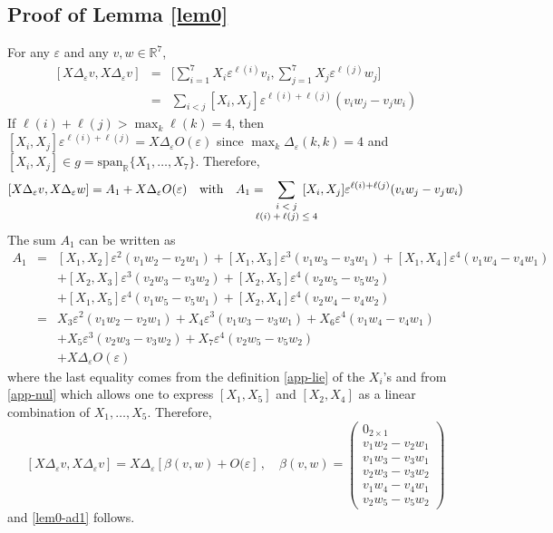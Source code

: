 \documentclass[a4paper,twoside]{article}
\def \RR {{\mathbb R}}
\def \eps {\varepsilon}
\begin{document}
\subsection*{Proof of Lemma \ref{lem0}}
For any $\eps$ and any $v,w \in \RR^7$,
\[
\begin{array}{lcl}
[X \Delta_\eps v, X \Delta_\eps v] & = & 
\displaystyle \bigl [ \sum_{i=1}^7 X_i \eps^{\ell(i)} v_i, \sum_{j=1}^7 X_j \eps^{\ell(j)} w_j \bigr ] \\
 & = & \displaystyle \sum_{i<j} [X_i,X_j] \eps^{\ell(i) + \ell(j)} (v_i w_j -v_j w_i)
\end{array}
\]
If $\ell(i)+ \ell(j) > \max_k \ell(k) = 4$, then $[X_i,X_j]  \eps^{\ell(i) + \ell(j)} = X \Delta_\eps O(\eps)$ since 
$\max_k \Delta_\eps(k,k)=4$ and $[X_i,X_j] \in g = \text{span}_\RR \{ X_1, \ldots, X_7 \}$. Therefore,
\[
[X \Delta_\eps v, X \Delta_\eps w]  =  A_1 +  X \Delta_\eps O(\eps) \quad \text{with} \quad  
A_1=  \hspace{-.5cm}
\displaystyle \sum_{
\begin{scriptsize}
\begin{array}{c}
i<j \\
\ell(i) + \ell(j) \leq 4
\end{array}
\end{scriptsize}
} \hspace*{-.6cm}
[X_i,X_j] \eps^{\ell(i) + \ell(j)} (v_i w_j -v_j w_i)
\]
The sum $A_1$ can be written as 
\[
\begin{array}{lcl}
A_1  & = &
[X_1, X_2] \eps^2 (v_1 w_2 -v_2 w_1) + [X_1,X_3] \eps^3  (v_1 w_3 -v_3 w_1) + [X_1,X_4] \eps^4  (v_1 w_4 -v_4 w_1)  \\
 & & + [X_2, X_3] \eps^3  (v_2 w_3 -v_3 w_2) + [X_2,X_5] \eps^4  (v_2 w_5 -v_5 w_2) \\
 & & + [X_1,X_5] \eps^4  (v_1 w_5 -v_5 w_1) + [X_2, X_4] \eps^4  (v_2 w_4 -v_4 w_2)  \\
 & = &  X_3 \eps^2 (v_1 w_2 -v_2 w_1) + X_4 \eps^3  (v_1 w_3 -v_3 w_1) + X_6 \eps^4  (v_1 w_4 -v_4 w_1) \\
 &  & + X_5 \eps^3  (v_2 w_3 -v_3 w_2) + X_7 \eps^4  (v_2 w_5 -v_5 w_2) \\
 &  & + X \Delta_\eps O(\eps)
\end{array}
\]
where the last equality comes from the definition \eqref{app-lie} of the $X_i$'s and from \eqref{app-nul} which allows 
one to express
$[X_1,X_5]$ and $[X_2,X_4]$ as a linear combination  of $X_1, \ldots, X_5$. Therefore,
\[
[X \Delta_\eps v, X \Delta_\eps v] = X \Delta_\eps \left[ \beta(v,w) + O(\eps \right] \, , \quad 
\beta(v,w)= 
\begin{pmatrix}
0_{2 \times 1} \\
v_1 w_2 -v_2 w_1 \\
v_1 w_3 -v_3 w_1 \\
v_2 w_3 -v_3 w_2 \\
v_1 w_4 -v_4 w_1 \\
v_2 w_5 -v_5 w_2
\end{pmatrix}
\]
and \eqref{lem0-ad1} follows.
\end{document}
